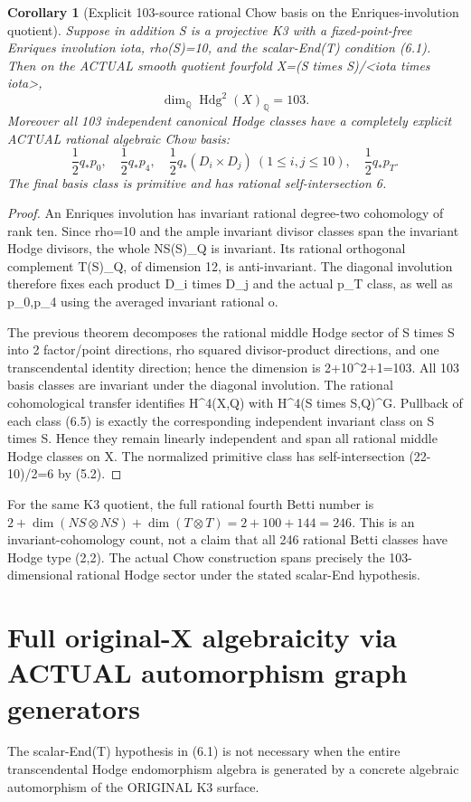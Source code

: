 \documentclass[11pt]{article}
\newcommand{\Q}{\mathbb Q}
\newtheorem{corollary}[theorem]{Corollary}
\begin{document}
\begin{corollary}[Explicit 103-source rational Chow basis on the Enriques-involution quotient]
Suppose in addition S is a projective K3 with
a fixed-point-free Enriques involution iota,
rho(S)=10, and the scalar-End(T) condition
(6.1). Then on the ACTUAL smooth quotient
fourfold X=(S times S)/<iota times iota>,
\[
 \boxed{\dim_\Q\operatorname{Hdg}^2(X)_\Q=103.}     \tag{6.4}
\]
Moreover all 103 independent canonical Hodge
classes have a completely explicit ACTUAL
rational algebraic Chow basis:
\[
 \boxed{
 \frac12q_*p_0,\quad
 \frac12q_*p_4,\quad
 \frac12q_*(D_i\times D_j)\ (1\le i,j\le10),\quad
 \frac12q_*p_T .}                                   \tag{6.5}
\]
The final basis class is primitive and has
rational self-intersection 6.
\end{corollary}
\begin{proof}
An Enriques involution has invariant rational
degree-two cohomology of rank ten.
Since rho=10 and the ample invariant divisor
classes span the invariant Hodge divisors,
the whole NS(S)_Q is invariant. Its rational
orthogonal complement T(S)_Q, of dimension 12,
is anti-invariant. The diagonal involution
therefore fixes each product D_i times D_j
and the actual p_T class, as well as p_0,p_4
using the averaged invariant rational o.

The previous theorem decomposes the rational
middle Hodge sector of S times S into
2 factor/point directions, rho squared
divisor-product directions, and one
transcendental identity direction; hence
the dimension is 2+10^2+1=103.
All 103 basis classes are invariant under
the diagonal involution. The rational
cohomological transfer identifies H^4(X,Q)
with H^4(S times S,Q)^{G}.
Pullback of each class (6.5) is exactly
the corresponding independent invariant
class on S times S. Hence they remain
linearly independent and span all
rational middle Hodge classes on X.
The normalized primitive class has
self-intersection (22-10)/2=6 by (5.2).
\end{proof}

For the same K3 quotient, the full rational
fourth Betti number is
\(
 2+\dim(NS\otimes NS)+\dim(T\otimes T)
 =2+100+144=246
\).
This is an invariant-cohomology count,
not a claim that all 246 rational Betti
classes have Hodge type (2,2). The
actual Chow construction spans precisely
the 103-dimensional rational Hodge sector
under the stated scalar-End hypothesis.

\section{Full original-X algebraicity via ACTUAL automorphism graph generators}
The scalar-End(T) hypothesis in (6.1) is not necessary
when the entire transcendental Hodge endomorphism
algebra is generated by a concrete algebraic
automorphism of the ORIGINAL K3 surface.
\end{document}

